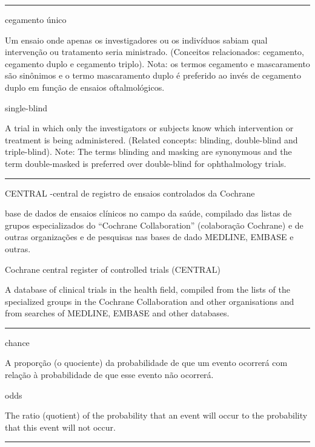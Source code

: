 \documentclass[
]{book}
\begin{document}
\begin{center}\rule{0.5\linewidth}{0.5pt}\end{center}

cegamento único

Um ensaio onde apenas os investigadores ou os indivíduos sabiam qual intervenção ou tratamento seria ministrado. (Conceitos relacionados: cegamento, cegamento duplo e cegamento triplo). Nota: os termos cegamento e mascaramento são sinônimos e o termo mascaramento duplo é preferido ao invés de cegamento duplo em função de ensaios oftalmológicos.

single-blind

A trial in which only the investigators or subjects know which intervention or treatment is being administered. (Related concepts: blinding, double-blind and triple-blind). Note: The terms blinding and masking are synonymous and the term double-masked is preferred over double-blind for ophthalmology trials.

\begin{center}\rule{0.5\linewidth}{0.5pt}\end{center}

CENTRAL -central de registro de ensaios controlados da Cochrane

base de dados de ensaios clínicos no campo da saúde, compilado das listas de grupos especializados do ``Cochrane Collaboration'' (colaboração Cochrane) e de outras organizações e de pesquisas nas bases de dado MEDLINE, EMBASE e outras.

Cochrane central register of controlled trials (CENTRAL)

A database of clinical trials in the health field, compiled from the lists of the specialized groups in the Cochrane Collaboration and other organisations and from searches of MEDLINE, EMBASE and other databases.

\begin{center}\rule{0.5\linewidth}{0.5pt}\end{center}

chance

A proporção (o quociente) da probabilidade de que um evento ocorrerá com relação à probabilidade de que esse evento não ocorrerá.

odds

The ratio (quotient) of the probability that an event will occur to the probability that this event will not occur.

\begin{center}\rule{0.5\linewidth}{0.5pt}\end{center}
\end{document}
